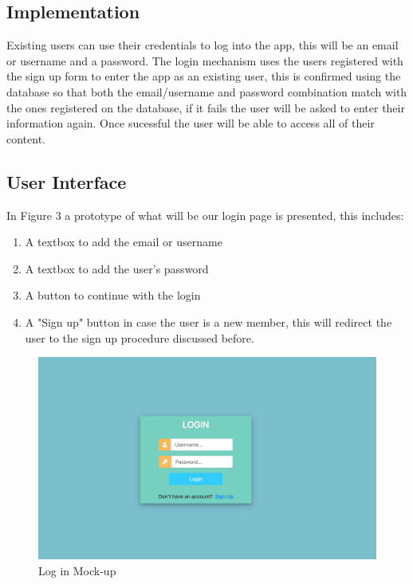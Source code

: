 \documentclass{article}
\begin{document}
  \subsection{Implementation}

  Existing users can use their credentials to log into the app, this will be an email or username and a password. The login mechanism uses the users registered with the sign up form to enter the app as an existing user, this is confirmed using the database so that both the email/username and password combination match with the ones registered on the database, if it fails the user will be asked to enter their information again. Once sucessful the user will be able to access all of their content.

  \subsection{User Interface}

  In Figure 3 a prototype of what will be our login page is presented, this includes:
  \begin{enumerate}
    \item A textbox to add the email or username
    \item A textbox to add the user's password
    \item A button to continue with the login
    \item A "Sign up" button in case the user is a new member, this will redirect the user to the sign up procedure discussed before.
  \end{enumerate}

  \begin{figure}[h!]
      \centering
      \includegraphics[width=1.2\columnwidth]{Images/loginUI.jpg}
      \caption{Log in Mock-up}
      \label{fig:figure 3}
  \end{figure}
\end{document}
